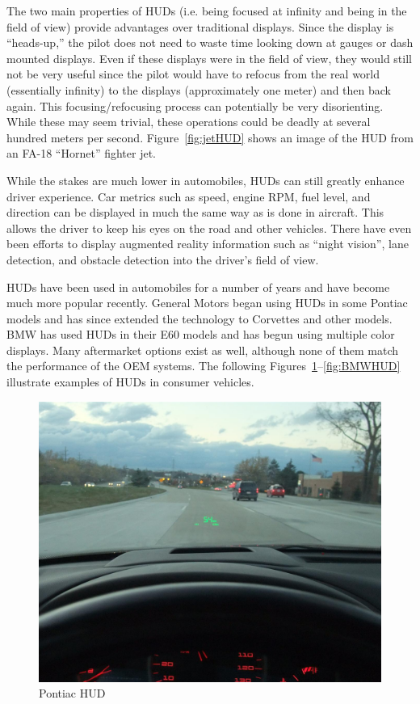 The two main properties of HUDs (i.e. being focused at infinity and being
in the field of view) provide advantages over traditional displays. Since
the display is ``heads-up,'' the pilot does not need to waste time looking
down at gauges or dash mounted displays. Even if these displays were in the
field of view, they would still not be very useful since the pilot would
have to refocus from the real world (essentially infinity) to the displays
(approximately one meter) and then back again. This focusing/refocusing
process can potentially be very disorienting. While these may seem trivial,
these operations could be deadly at several hundred meters per second.
Figure~\ref{fig:jetHUD} shows an image of the HUD from an FA-18 ``Hornet''
fighter jet.

While the stakes are much lower in automobiles, HUDs can still greatly
enhance driver experience. Car metrics such as speed, engine RPM, fuel
level, and direction can be displayed in much the same way as is done in
aircraft. This allows the driver to keep his eyes on the road and other
vehicles. There have even been efforts to display augmented reality
information such as ``night vision'', lane detection, and obstacle detection
into the driver's field of view.

HUDs have been used in automobiles for a number of years and have become
much more popular recently. General Motors began using HUDs in some Pontiac
models and has since extended the technology to Corvettes and other models.
BMW has used HUDs in their E60 models and has begun using multiple color
displays. Many aftermarket options exist as well, although none of them
match the performance of the OEM systems. The following
Figures~\ref{fig:PontiacHUD}--\ref{fig:BMWHUD} illustrate examples of HUDs
in consumer vehicles.

\begin{figure}
	\includegraphics[width=\textwidth]{img/PontiacHUD.jpg}
	\caption{Pontiac HUD}
	\label{fig:PontiacHUD}
\end{figure}

